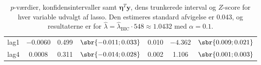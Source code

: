 \begin{table}[h]
{\begin{tabular}{lcccccc}
\textcolor{blue3}{lag1} &$-0.0060$ &0.499  &  $\sbr{-0.011 ; 0.033}$ &  0.010& $ -4.362$ &  $\sbr{0.009           ;    0.021 }$\\
\textcolor{blue3}{lag4}  & 0.0008&0.311    & $\sbr{ -0.014;   0.028 }$ &0.002 &   1.106   & $\sbr{0.001              ; 0.003}$\\
\bottomrule
\end{tabular}  
}
\caption{\(p\)-værdier, konfidensintervaller samt  $\boldsymbol{\eta}^T\textbf{y}$, dens trunkerede interval og $Z$-score for hver variable udvalgt af lasso. Den estimeres standard afvigelse er 0.043, og resultaterne er for $\widehat{\lambda} = \widehat{\lambda}_\text{BIC} \cdot 548 \approx 1.0432$  med \(\alpha = 0.1\).} \label{tab:fixedLassoInf_bic}
\end{table} 